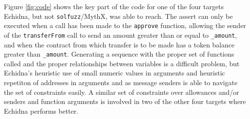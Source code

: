 Figure \ref{fig:code} shows the key part of the code for one of the four targets Echidna, but not {\tt solfuzz}/MythX, was able to reach.  The assert can only be executed when a call has been made to the {\tt approve} function, allowing the sender of the {\tt transferFrom} call to send an amount greater than or equal to {\tt \_amount}, and when  the contract from which transfer is to be made has a token balance greater than {\tt \_amount}.  Generating a sequence with the proper set of functions called and the proper relationships between variables is a difficult problem, but Echidna's heuristic use of small numeric values in arguments and heuristic repetiton of addresses in arguments and as message senders is able to navigate the set of constraints easily.  A similar set of constraints over allowances and/or senders and function arguments is involved in two of the other four targets where Echidna performs better.


